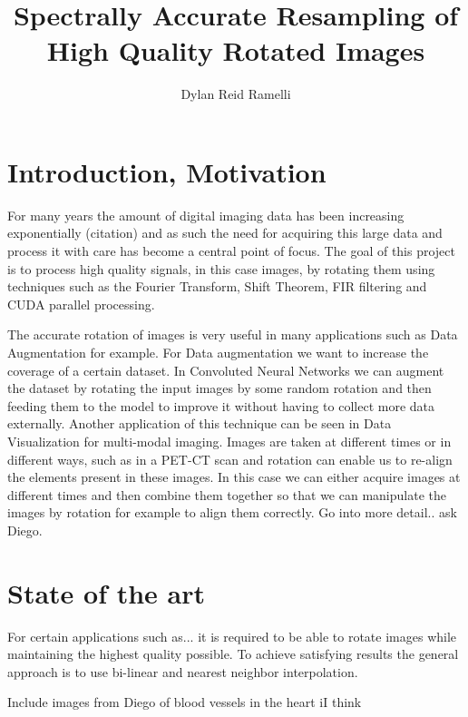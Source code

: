 \documentclass[]{usiinfbachelorproject}
\title{Spectrally Accurate Resampling of High Quality Rotated Images}
\author{Dylan Reid Ramelli}
\begin{document}
	
	\maketitle
		
		
	\tableofcontents
	\newpage
	\section{Introduction, Motivation}\label{introduction}
	
	For many years the amount of digital imaging data has been increasing exponentially (citation) and as such the need for acquiring this large data and process it with care has become a central point of focus. The goal of this project is to process high quality signals, in this case images, by rotating them using techniques such as the Fourier Transform, Shift Theorem, FIR filtering and CUDA parallel processing.
	
	
	
	
	
	
	The accurate rotation of images is very useful in many applications such as Data Augmentation for example. For Data augmentation we want to increase the coverage of a certain dataset. In Convoluted Neural Networks we can augment the dataset by rotating the input images by some random rotation and then feeding them to the model to improve it without having to collect more data externally.
	Another application of this technique can be seen in Data Visualization for multi-modal imaging. Images are taken at different times or in different ways, such as in a PET-CT scan and rotation can enable us to re-align the elements present in these images. In this case we can either acquire images at different times and then combine them together so that we can manipulate the images by rotation for example to align them correctly. Go into more detail.. ask Diego.
	
	
	
	

	
	\section{State of the art}
	For certain applications such as... it is required to be able to rotate images while maintaining the highest quality possible. To achieve satisfying results the general approach is to use bi-linear and nearest neighbor interpolation.
	
	
	Include images from Diego of blood vessels in the heart iI think
	
\end{document}
